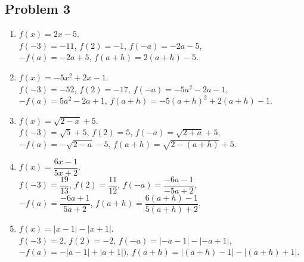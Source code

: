 \documentclass[12pt]{article}
\begin{document}
\subsection*{Problem 3}
\begin{enumerate}
    \item \( f(x) = 2x - 5 \).\\
    \( f(-3) = -11 \), \hspace{0.7cm} \( f(2) = -1 \), \hspace{0.7cm} \( f(-a) = -2a - 5 \),\\
    \( -f(a) = -2a + 5 \), \hspace{0.7cm} \( f(a+h) = 2(a+h) - 5 \).

    \item \( f(x) = -5x^2 + 2x - 1 \).\\
    \( f(-3) = -52 \), \hspace{0.7cm} \( f(2) = -17 \), \hspace{0.7cm} \( f(-a) = -5a^2 - 2a - 1 \),\\
    \( -f(a) = 5a^2 - 2a + 1 \), \hspace{0.7cm} \( f(a+h) = -5(a+h)^2 + 2(a+h) - 1 \).

    \item \( f(x) = \sqrt{2-x} + 5 \).\\
    \( f(-3) = \sqrt{5} + 5 \), \hspace{0.7cm} \( f(2) = 5 \), \hspace{0.7cm} \( f(-a) = \sqrt{2 + a} + 5 \),\\
    \( -f(a) = -\sqrt{2 - a} - 5 \),\hspace{0.7cm} \( f(a+h) = \sqrt{2 - (a+h)} + 5 \).

    \item \( f(x) = \dfrac{6x-1}{5x+2} \).\\ 
    \( f(-3) = \dfrac{19}{13} \),\hspace{0.7cm} \( f(2) = \dfrac{11}{12} \),\hspace{0.7cm} \( f(-a) = \dfrac{-6a - 1}{-5a + 2} \),\\
    \( -f(a) = \dfrac{-6a + 1}{5a + 2} \),\hspace{0.7cm} \( f(a+h) = \dfrac{6(a+h) - 1}{5(a+h) + 2} \).

    \item \( f(x) = |x - 1| - |x + 1| \).\\ 
    \( f(-3) = 2 \), \hspace{0.7cm}\( f(2) = -2 \),\hspace{0.7cm} \( f(-a) = | -a - 1 | - | -a + 1 | \),\\
    \( -f(a) = -|a - 1| + |a + 1|) \),\hspace{0.7cm} \( f(a+h) = |(a+h) - 1| - |(a+h) + 1| \).
\end{enumerate}
\end{document}
